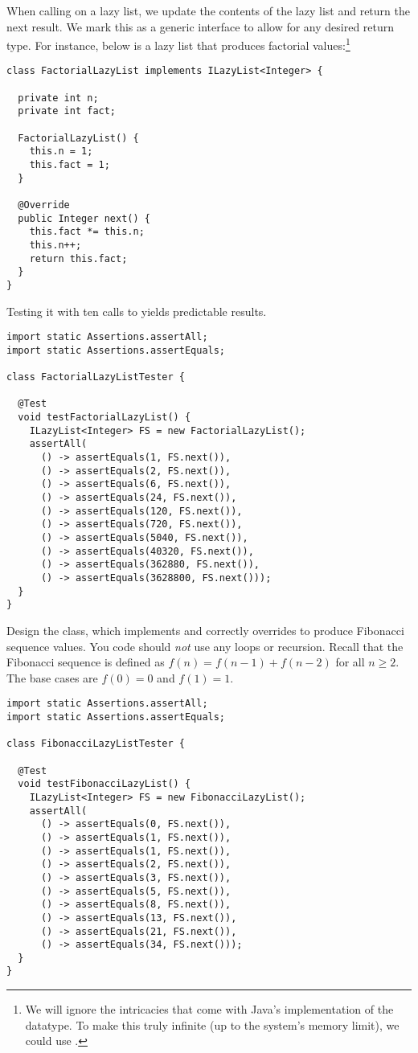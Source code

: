 When calling  on a lazy list, we update the contents of the lazy list and return the next result. We mark this as a generic interface to allow for any desired return type. For instance, below is a lazy list that produces factorial values:\footnote{We will ignore the intricacies that come with Java's implementation of the  datatype. To make this truly infinite (up to the system's memory limit), we could use .}
\begin{lstlisting}[language=MyJava]
class FactorialLazyList implements ILazyList<Integer> {

  private int n;
  private int fact;
 
  FactorialLazyList() {
    this.n = 1;
    this.fact = 1;
  }

  @Override
  public Integer next() {
    this.fact *= this.n;
    this.n++;
    return this.fact;
  }
}
\end{lstlisting}

Testing it with ten calls to  yields predictable results.

\begin{lstlisting}[language=MyJava]
import static Assertions.assertAll;
import static Assertions.assertEquals;

class FactorialLazyListTester {

  @Test
  void testFactorialLazyList() {
    ILazyList<Integer> FS = new FactorialLazyList();
    assertAll(
      () -> assertEquals(1, FS.next()),
      () -> assertEquals(2, FS.next()),
      () -> assertEquals(6, FS.next()),
      () -> assertEquals(24, FS.next()),
      () -> assertEquals(120, FS.next()),
      () -> assertEquals(720, FS.next()),
      () -> assertEquals(5040, FS.next()),
      () -> assertEquals(40320, FS.next()),
      () -> assertEquals(362880, FS.next()),
      () -> assertEquals(3628800, FS.next()));
  }
}
\end{lstlisting}

Design the  class, which implements  and correctly overrides  to produce Fibonacci sequence values. You code should \emph{not} use any loops or recursion. Recall that the Fibonacci sequence is defined as $f(n) = f(n - 1) + f(n - 2)$ for all $n\geq{2}$. The base cases are $f(0) = 0$ and $f(1) = 1$.

\begin{lstlisting}[language=MyJava]
import static Assertions.assertAll;
import static Assertions.assertEquals;

class FibonacciLazyListTester {

  @Test
  void testFibonacciLazyList() {
    ILazyList<Integer> FS = new FibonacciLazyList();
    assertAll(
      () -> assertEquals(0, FS.next()),
      () -> assertEquals(1, FS.next()),
      () -> assertEquals(1, FS.next()),
      () -> assertEquals(2, FS.next()),
      () -> assertEquals(3, FS.next()),
      () -> assertEquals(5, FS.next()),
      () -> assertEquals(8, FS.next()),
      () -> assertEquals(13, FS.next()),
      () -> assertEquals(21, FS.next()),
      () -> assertEquals(34, FS.next()));
  }
}
\end{lstlisting}

